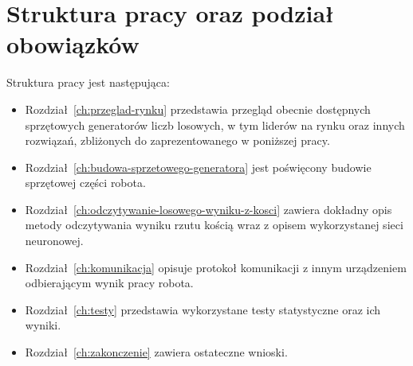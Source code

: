 \section{Struktura pracy oraz podział obowiązków}\label{sec:struktura-pracy-oraz-podzia-obowiazkow}

Struktura pracy jest następująca:
\begin{itemize}
    \item Rozdział~\ref{ch:przeglad-rynku} przedstawia przegląd obecnie dostępnych sprzętowych generatorów liczb losowych,
    w tym liderów na rynku oraz innych rozwiązań, zbliżonych do zaprezentowanego w poniższej pracy.
    \item Rozdział~\ref{ch:budowa-sprzetowego-generatora} jest poświęcony budowie sprzętowej części robota.
    \item Rozdział~\ref{ch:odczytywanie-losowego-wyniku-z-kosci} zawiera dokładny opis metody odczytywania wyniku rzutu kością
    wraz z opisem wykorzystanej sieci neuronowej.
    \item Rozdział~\ref{ch:komunikacja} opisuje protokoł komunikacji z innym urządzeniem odbierającym wynik pracy robota. 
    \item Rozdział~\ref{ch:testy} przedstawia wykorzystane testy statystyczne oraz ich wyniki.
    \item Rozdział~\ref{ch:zakonczenie} zawiera ostateczne wnioski.
\end{itemize}

